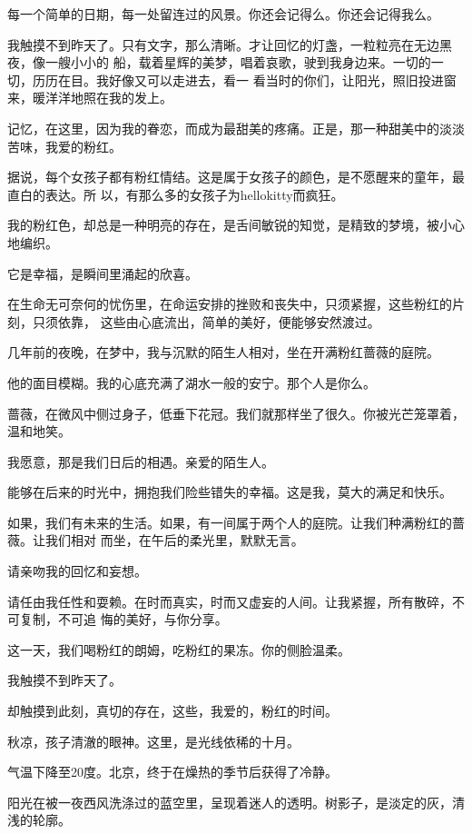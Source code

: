		每一个简单的日期，每一处留连过的风景。你还会记得么。你还会记得我么。

		我触摸不到昨天了。只有文字，那么清晰。才让回忆的灯盏，一粒粒亮在无边黑夜，像一艘小小的
	船，载着星辉的美梦，唱着哀歌，驶到我身边来。一切的一切，历历在目。我好像又可以走进去，看一
	看当时的你们，让阳光，照旧投进窗来，暖洋洋地照在我的发上。

		记忆，在这里，因为我的眷恋，而成为最甜美的疼痛。正是，那一种甜美中的淡淡苦味，我爱的粉红。

		据说，每个女孩子都有粉红情结。这是属于女孩子的颜色，是不愿醒来的童年，最直白的表达。所
	以，有那么多的女孩子为hellokitty而疯狂。

		我的粉红色，却总是一种明亮的存在，是舌间敏锐的知觉，是精致的梦境，被小心地编织。\par
		它是幸福，是瞬间里涌起的欣喜。

		在生命无可奈何的忧伤里，在命运安排的挫败和丧失中，只须紧握，这些粉红的片刻，只须依靠，
	这些由心底流出，简单的美好，便能够安然渡过。

		几年前的夜晚，在梦中，我与沉默的陌生人相对，坐在开满粉红蔷薇的庭院。\par
		他的面目模糊。我的心底充满了湖水一般的安宁。那个人是你么。\par
		蔷薇，在微风中侧过身子，低垂下花冠。我们就那样坐了很久。你被光芒笼罩着，温和地笑。\par
		我愿意，那是我们日后的相遇。亲爱的陌生人。\par
		能够在后来的时光中，拥抱我们险些错失的幸福。这是我，莫大的满足和快乐。

		如果，我们有未来的生活。如果，有一间属于两个人的庭院。让我们种满粉红的蔷薇。让我们相对
	而坐，在午后的柔光里，默默无言。

		请亲吻我的回忆和妄想。

		请任由我任性和耍赖。在时而真实，时而又虚妄的人间。让我紧握，所有散碎，不可复制，不可追
	悔的美好，与你分享。

		这一天，我们喝粉红的朗姆，吃粉红的果冻。你的侧脸温柔。\par
		我触摸不到昨天了。\par
		却触摸到此刻，真切的存在，这些，我爱的，粉红的时间。

	\endwriting



		秋凉，孩子清澈的眼神。这里，是光线依稀的十月。

		气温下降至20度。北京，终于在燥热的季节后获得了冷静。\par
		阳光在被一夜西风洗涤过的蓝空里，呈现着迷人的透明。树影子，是淡定的灰，清浅的轮廓。

